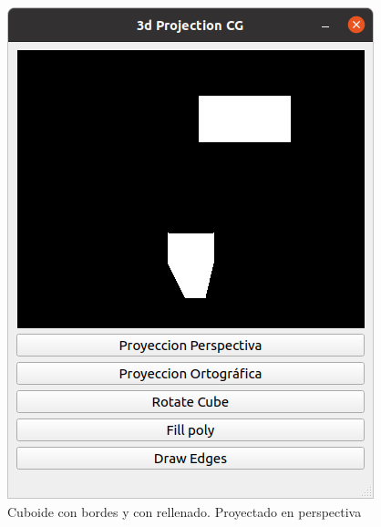 \documentclass[12pt]{article}
\begin{document}
\begin{figure}[H]
\includegraphics[scale=0.5]{images/ej2.png}
\caption{Cuboide con bordes y con rellenado. Proyectado en perspectiva}
\end{figure}
\end{document}
